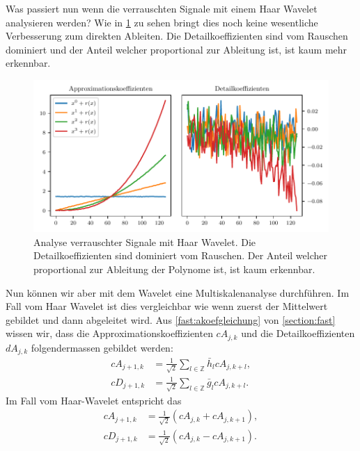 \begin{refsection}
Was passiert nun wenn die verrauschten Signale mit einem Haar Wavelet
analysieren werden? Wie in \cref{polynomials:noise:db1} zu sehen bringt dies
noch keine wesentliche Verbesserung zum direkten Ableiten. Die
Detailkoeffizienten sind vom Rauschen dominiert und der Anteil welcher
proportional zur Ableitung ist, ist kaum mehr erkennbar.

\begin{figure}
    \centering
    \includegraphics{papers/polynomials/images/polynomials_noise_db1.pdf}
    \caption{Analyse verrauschter Signale mit Haar Wavelet. Die
             Detailkoeffizienten sind dominiert vom Rauschen. Der Anteil
             welcher proportional zur Ableitung der Polynome ist, ist kaum
             erkennbar.\label{polynomials:noise:db1}}
\end{figure}

Nun können wir aber mit dem Wavelet eine Multiskalenanalyse durchführen. Im
Fall vom Haar Wavelet ist dies vergleichbar wie wenn zuerst der Mittelwert
gebildet und dann abgeleitet wird. Aus \cref{fast:akoefgleichung} von
\cref{section:fast} wissen wir, dass die Approximationskoeffizienten $cA_{j,k}$
und die Detailkoeffizienten $dA_{j,k}$ folgendermassen gebildet werden:
\begin{align}
cA_{j+1,k}
&=
\frac{1}{\sqrt{2}} \sum_{l\in\mathbb Z} \bar{h}_l cA_{j,k+l},
\nonumber \\
cD_{j+1,k}
&=
\frac{1}{\sqrt{2}} \sum_{l\in\mathbb Z} \bar{g}_l cA_{j,k+l}.
\end{align}
Im Fall vom Haar-Wavelet entspricht das
\begin{align}
cA_{j+1,k}
&=
\frac{1}{\sqrt{2}} (cA_{j,k} + cA_{j,k+1}),
\nonumber \\
cD_{j+1,k}
&=
\frac{1}{\sqrt{2}} (cA_{j,k} - cA_{j,k+1}).
\end{align}


\end{refsection}
